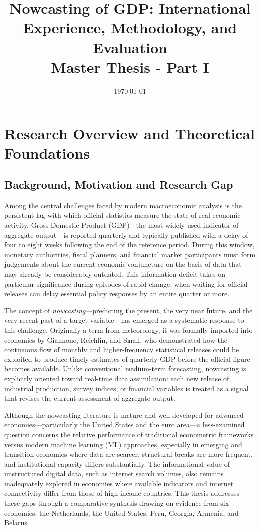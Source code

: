 \documentclass[12pt,a4paper]{report}
\title{\textbf{Nowcasting of GDP: International Experience, Methodology, and Evaluation}\\
\large Master Thesis - Part I}
\author{}
\date{\today}
\begin{document}
\maketitle
\tableofcontents

\chapter{Research Overview and Theoretical Foundations}

\section{Background, Motivation and Research Gap}

Among the central challenges faced by modern macroeconomic analysis is
the persistent lag with which official statistics measure the state of
real economic activity. Gross Domestic Product (GDP)---the most widely
used indicator of aggregate output---is reported quarterly and typically
published with a delay of four to eight weeks following the end of the
reference period. During this window, monetary authorities, fiscal
planners, and financial market participants must form judgements about
the current economic conjuncture on the basis of data that may already
be considerably outdated. This information deficit takes on particular
significance during episodes of rapid change, when waiting for official
releases can delay essential policy responses by an entire quarter or
more.

The concept of \textit{nowcasting}---predicting the present, the very
near future, and the very recent past of a target variable---has emerged
as a systematic response to this challenge. Originally a term from
meteorology, it was formally imported into economics by Giannone,
Reichlin, and Small, who demonstrated how the continuous flow of monthly
and higher-frequency statistical releases could be exploited to produce
timely estimates of quarterly GDP before the official figure becomes
available.\citep{Giannone2008} Unlike conventional medium-term
forecasting, nowcasting is explicitly oriented toward real-time data
assimilation: each new release of industrial production, survey indices,
or financial variables is treated as a signal that revises the current
assessment of aggregate output.

Although the nowcasting literature is mature and well-developed for
advanced economies---particularly the United States and the euro
area---a less-examined question concerns the relative performance of
traditional econometric frameworks versus modern machine learning (ML)
approaches, especially in emerging and transition economies where data
are scarcer, structural breaks are more frequent, and institutional
capacity differs substantially. The informational value of unstructured
digital data, such as internet search volumes, also remains inadequately
explored in economies where available indicators and internet
connectivity differ from those of high-income countries. This thesis
addresses these gaps through a comparative synthesis drawing on evidence
from six economies: the Netherlands, the United States, Peru, Georgia,
Armenia, and Belarus.
\end{document}
